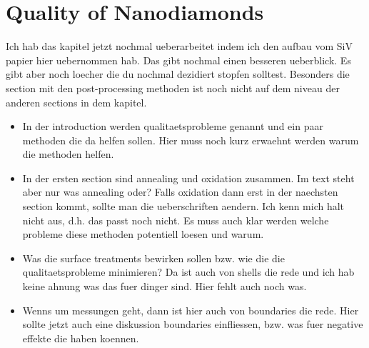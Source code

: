 
\chapter{Quality of Nanodiamonds}	\label{ch::crystal_quality}

		\begin{remark}
				Ich hab das kapitel jetzt nochmal ueberarbeitet indem ich den aufbau vom SiV papier hier uebernommen hab. Das gibt nochmal einen besseren ueberblick. Es gibt aber noch loecher die du nochmal dezidiert stopfen solltest. Besonders die section mit den post-processing methoden ist noch nicht auf dem niveau der anderen sections in dem kapitel.

				\begin{itemize}
					\item In der introduction werden qualitaetsprobleme genannt und ein paar methoden die da helfen sollen. Hier muss noch kurz erwaehnt werden warum die methoden helfen.
					\item In der ersten section sind annealing und oxidation zusammen. Im text steht aber nur was annealing oder? Falls oxidation dann erst in der naechsten section kommt, sollte man die ueberschriften aendern. Ich kenn mich halt nicht aus, d.h. das passt noch nicht. Es muss auch klar werden welche probleme diese methoden potentiell loesen und warum.
					\item Was die surface treatments bewirken sollen bzw. wie die die qualitaetsprobleme minimieren? Da ist auch von shells die rede und ich hab keine ahnung was das fuer dinger sind. Hier fehlt auch noch was.
					\item Wenns um \TEM messungen geht, dann ist hier auch von \nd boundaries die rede. Hier sollte jetzt auch eine diskussion boundaries einfliessen, bzw. was fuer negative effekte die haben koennen.
				\end{itemize}

		\end{remark}

